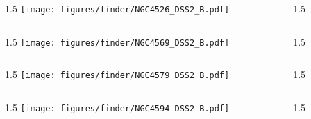 \documentclass[final]{beamer}
\newlength{\colwidth}
\begin{document}

\begin{frame}[t]{}
  \begin{columns}[T]
    \begin{column}{1.5\colwidth}
      \centering
      \texttt{[image: figures/finder/NGC4526\_DSS2\_B.pdf]}
    \end{column}
    \begin{column}{1.5\colwidth}
      \Large
      
    \end{column}
  \end{columns}
  \vspace{\fill}
  \begin{columns}[T]
    \begin{column}{1.5\colwidth}
      \centering
      \texttt{[image: figures/finder/NGC4569\_DSS2\_B.pdf]}
    \end{column}
    \begin{column}{1.5\colwidth}
      \Large
      
    \end{column}
  \end{columns}
\end{frame}


\begin{frame}[t]{}
  \begin{columns}[T]
    \begin{column}{1.5\colwidth}
      \centering
      \texttt{[image: figures/finder/NGC4579\_DSS2\_B.pdf]}
    \end{column}
    \begin{column}{1.5\colwidth}
      \Large
      
    \end{column}
  \end{columns}
  \vspace{\fill}
  \begin{columns}[T]
    \begin{column}{1.5\colwidth}
      \centering
      \texttt{[image: figures/finder/NGC4594\_DSS2\_B.pdf]}
    \end{column}
    \begin{column}{1.5\colwidth}
      \Large
      
    \end{column}
  \end{columns}
\end{frame}
\end{document}
